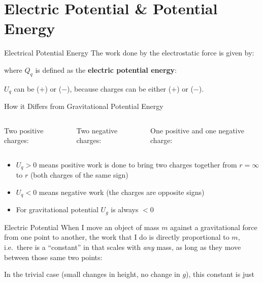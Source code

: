 \documentclass[12pt,aspectratio=169]{beamer}
\begin{document}
\section{Electric Potential \& Potential Energy}

\begin{frame}{Electrical Potential Energy}
  The work done by the electrostatic force is given by:
  

  where $Q_q$ is defined as the \textbf{electric potential energy}:
    

  $U_q$ can be ($+$) or ($-$), because charges can be either ($+$) or ($-$).
\end{frame}



\begin{frame}{How it Differs from Gravitational Potential Energy}
  \begin{columns}
    \centering
    Two positive charges:

    
    \centering
    Two negative charges:

    
    \centering
    One positive and one negative charge:

  \end{columns}
  \begin{itemize}
  \item $U_q>0$ means positive work is done to bring two charges together from
   $r=\infty$ to $r$ (both charges of the same sign)
  \item $U_q<0$ means negative work (the charges are opposite signs)
  \item For gravitational potential $U_g$ is always $<0$
  \end{itemize}
\end{frame}



\begin{frame}{Electric Potential}
  When I move an object of mass $m$ against a gravitational force from one
  point to another, the work that I do is directly proportional to $m$, i.e.\
  there is a ``constant'' in that scales with \emph{any} mass, as long as they
  move between those same two points:


  In the trivial case (small changes in height, no change in $g$), this
  constant is just

\end{frame}
\end{document}
